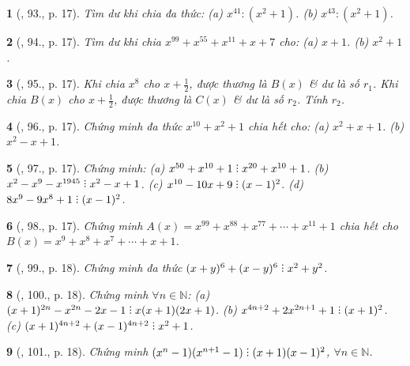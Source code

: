\documentclass{article}
\newtheorem{baitoan}{}
\DeclareRobustCommand{\divby}{%
	\mathrel{\vbox{\baselineskip.65ex\lineskiplimit0pt\hbox{.}\hbox{.}\hbox{.}}}%
}
\begin{document}
\begin{baitoan}[\cite{Binh_Toan_8_tap_1}, 93., p. 17]
	Tìm dư khi chia đa thức: (a) $x^{41}:(x^2 + 1)$. (b) $x^{43}:(x^2 + 1)$.
\end{baitoan}

\begin{baitoan}[\cite{Binh_Toan_8_tap_1}, 94., p. 17]
	Tìm dư khi chia $x^{99} + x^{55} + x^{11} + x + 7$ cho: (a) $x + 1$. (b) $x^2 + 1$.
\end{baitoan}

\begin{baitoan}[\cite{Binh_Toan_8_tap_1}, 95., p. 17]
	Khi chia $x^8$ cho $x + \frac{1}{2}$, được thương là $B(x)$ \& dư là số $r_1$. Khi chia $B(x)$ cho $x + \frac{1}{2}$, được thương là $C(x)$ \& dư là số $r_2$. Tính $r_2$.
\end{baitoan}

\begin{baitoan}[\cite{Binh_Toan_8_tap_1}, 96., p. 17]
	Chứng minh đa thức $x^{10} + x^2 + 1$ chia hết cho: (a) $x^2 + x + 1$. (b) $x^2 - x + 1$.
\end{baitoan}

\begin{baitoan}[\cite{Binh_Toan_8_tap_1}, 97., p. 17]
	Chứng minh: (a) $x^{50} + x^{10} + 1\divby x^{20} + x^{10} + 1$. (b) $x^2 - x^9 - x^{1945}\divby x^2 - x + 1$. (c) $x^{10} - 10x + 9\divby(x - 1)^2$. (d) $8x^9 - 9x^8 + 1\divby(x - 1)^2$.
\end{baitoan}

\begin{baitoan}[\cite{Binh_Toan_8_tap_1}, 98., p. 17]
	Chứng minh $A(x) = x^{99} + x^{88} + x^{77} + \cdots + x^{11} + 1$ chia hết cho $B(x) = x^9 + x^8 + x^7 + \cdots + x + 1$.
\end{baitoan}

\begin{baitoan}[\cite{Binh_Toan_8_tap_1}, 99., p. 18]
	Chứng minh đa thức $(x + y)^6 + (x - y)^6\divby x^2 + y^2$.
\end{baitoan}

\begin{baitoan}[\cite{Binh_Toan_8_tap_1}, 100., p. 18]
	Chứng minh $\forall n\in\mathbb{N}$: (a) $(x + 1)^{2n} - x^{2n} - 2x - 1\divby x(x + 1)(2x + 1)$. (b) $x^{4n+2} + 2x^{2n+1} + 1\divby(x + 1)^2$. (c) $(x + 1)^{4n+2} + (x - 1)^{4n+2}\divby x^2 + 1$.
\end{baitoan}

\begin{baitoan}[\cite{Binh_Toan_8_tap_1}, 101., p. 18]
	Chứng minh $(x^n - 1)(x^{n+1} - 1)\divby(x + 1)(x - 1)^2$, $\forall n\in\mathbb{N}$.
\end{baitoan}
\end{document}
